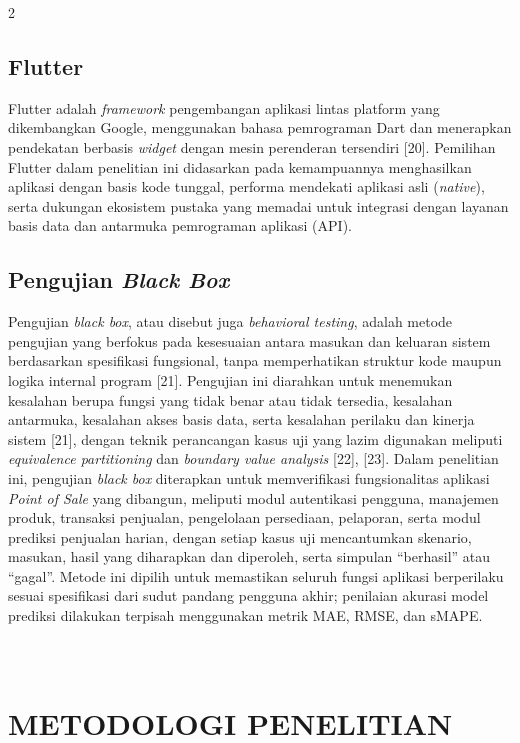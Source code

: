 \documentclass[12pt, a4paper, onecolumn, oneside]{report}
\begin{document}
\begin{spacing}{2}
\section{Flutter}

Flutter adalah \textit{framework} pengembangan aplikasi lintas platform yang dikembangkan Google, menggunakan bahasa pemrograman Dart dan menerapkan pendekatan berbasis \textit{widget} dengan mesin perenderan tersendiri [20]. Pemilihan Flutter dalam penelitian ini didasarkan pada kemampuannya menghasilkan aplikasi dengan basis kode tunggal, performa mendekati aplikasi asli (\textit{native}), serta dukungan ekosistem pustaka yang memadai untuk integrasi dengan layanan basis data dan antarmuka pemrograman aplikasi (API).

\section{Pengujian \textit{Black Box}}

Pengujian \textit{black box}, atau disebut juga \textit{behavioral testing}, adalah metode pengujian yang berfokus pada kesesuaian antara masukan dan keluaran sistem berdasarkan spesifikasi fungsional, tanpa memperhatikan struktur kode maupun logika internal program [21]. Pengujian ini diarahkan untuk menemukan kesalahan berupa fungsi yang tidak benar atau tidak tersedia, kesalahan antarmuka, kesalahan akses basis data, serta kesalahan perilaku dan kinerja sistem [21], dengan teknik perancangan kasus uji yang lazim digunakan meliputi \textit{equivalence partitioning} dan \textit{boundary value analysis} [22], [23]. Dalam penelitian ini, pengujian \textit{black box} diterapkan untuk memverifikasi fungsionalitas aplikasi \textit{Point of Sale} yang dibangun, meliputi modul autentikasi pengguna, manajemen produk, transaksi penjualan, pengelolaan persediaan, pelaporan, serta modul prediksi penjualan harian, dengan setiap kasus uji mencantumkan skenario, masukan, hasil yang diharapkan dan diperoleh, serta simpulan ``berhasil'' atau ``gagal''. Metode ini dipilih untuk memastikan seluruh fungsi aplikasi berperilaku sesuai spesifikasi dari sudut pandang pengguna akhir; penilaian akurasi model prediksi dilakukan terpisah menggunakan metrik MAE, RMSE, dan sMAPE.

\chapter[METODOLOGI PENELITIAN]{\\ METODOLOGI PENELITIAN}


\end{spacing}
\end{document}
